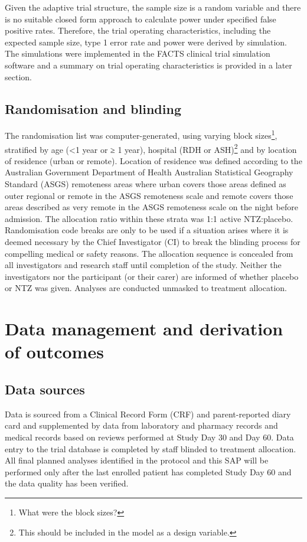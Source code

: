 \documentclass[a4paper]{article}
\begin{document}
Given the adaptive trial structure, the sample size is a random variable and there is no suitable closed form approach to calculate power under specified false positive rates.
Therefore, the trial operating characteristics, including the expected sample size, type 1 error rate and power were derived by simulation.
The simulations were implemented in the FACTS \cite{facts} clinical trial simulation software and a summary on trial operating characteristics is provided in a later section.

\subsection{Randomisation and blinding}

The randomisation list was computer-generated, using varying block sizes\footnote{What were the block sizes?}, stratified by age (<1 year or ≥ 1 year), hospital (RDH or ASH)\footnote{This should be included in the model as a design variable.} and by location of residence (urban or remote).
Location of residence was defined according to the Australian Government Department of Health Australian Statistical Geography Standard (ASGS) remoteness areas where urban covers those areas defined as outer regional or remote in the ASGS remoteness scale and remote covers those areas described as very remote in the ASGS remoteness scale on the night before admission. 
The allocation ratio within these strata was 1:1 active NTZ:placebo.
Randomisation code breaks are only to be used if a situation arises where it is deemed necessary by the Chief Investigator (CI) to break the blinding process for compelling medical or safety reasons. 
The allocation sequence is concealed from all investigators and research staff until completion of the study.
Neither the investigators nor the participant (or their carer) are informed of whether placebo or NTZ was given.
Analyses are conducted unmasked to treatment allocation.

\section{Data management and derivation of outcomes}

\subsection{Data sources}

Data is sourced from a Clinical Record Form (CRF) and parent-reported diary card and supplemented by data from laboratory and pharmacy records and medical records based on reviews performed at Study Day 30 and Day 60.
Data entry to the trial database is completed by staff blinded to treatment allocation.
All final planned analyses identified in the protocol and this SAP will be performed only after the last enrolled patient has completed Study Day 60 and the data quality has been verified.
\end{document}
